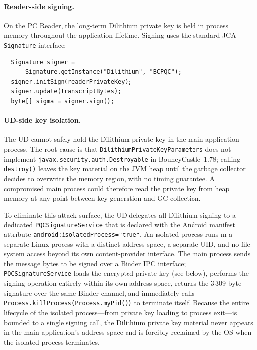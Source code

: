 \paragraph{Reader-side signing.}
On the PC Reader, the long-term Dilithium private key is held in process
memory throughout the application lifetime.
Signing uses the standard JCA \texttt{Signature} interface:
\begin{verbatim}
  Signature signer =
      Signature.getInstance("Dilithium", "BCPQC");
  signer.initSign(readerPrivateKey);
  signer.update(transcriptBytes);
  byte[] sigma = signer.sign();
\end{verbatim}

\paragraph{UD-side key isolation.}
The UD cannot safely hold the Dilithium private key in the main application
process.
The root cause is that \texttt{DilithiumPrivateKeyParameters} does not
implement \texttt{javax.security.auth.Destroyable} in BouncyCastle~1.78;
calling \texttt{destroy()} leaves the key material on the JVM heap until the
garbage collector decides to overwrite the memory region, with no timing
guarantee.
A compromised main process could therefore read the private key from heap
memory at any point between key generation and GC collection.

To eliminate this attack surface, the UD delegates all Dilithium signing to a
dedicated \texttt{PQCSignatureService} that is declared with the Android
manifest attribute \texttt{android:isolatedProcess="true"}.
An isolated process runs in a separate Linux process with a distinct address
space, a separate UID, and no file-system access beyond its own
content-provider interface.
The main process sends the message bytes to be signed over a Binder IPC
interface; \texttt{PQCSignatureService} loads the encrypted private key (see
below), performs the signing operation entirely within its own address space,
returns the 3\,309-byte signature over the same Binder channel, and
immediately calls \texttt{Process.killProcess(Process.myPid())} to terminate
itself.
Because the entire lifecycle of the isolated process---from private key
loading to process exit---is bounded to a single signing call, the Dilithium
private key material never appears in the main application's address space and
is forcibly reclaimed by the OS when the isolated process terminates.

